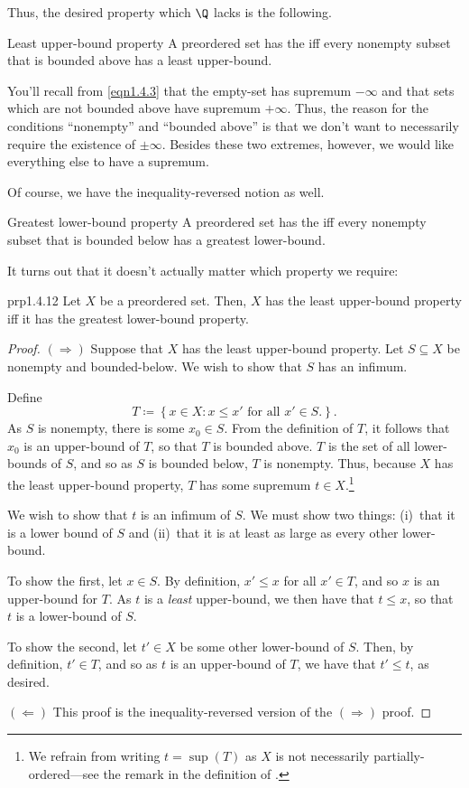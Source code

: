 Thus, the desired property which $\Q$ lacks is the following.
\begin{dfn}{Least upper-bound property}{}
A preordered set has the  iff every nonempty subset that is bounded above has a least upper-bound.
\begin{rmk}
You'll recall from \eqref{eqn1.4.3} that the empty-set has supremum $-\infty$ and that sets which are not bounded above have supremum $+\infty$.  Thus, the reason for the conditions ``nonempty'' and ``bounded above'' is that we don't want to necessarily require the existence of $\pm \infty$.  Besides these two extremes, however, we would like everything else to have a supremum.
\end{rmk}
\end{dfn}
Of course, we have the inequality-reversed notion as well.
\begin{dfn}{Greatest lower-bound property}{}
A preordered set has the  iff every nonempty subset that is bounded below has a greatest lower-bound.
\end{dfn}
It turns out that it doesn't actually matter which property we require:
\begin{prp}{}{prp1.4.12}
Let $X$ be a preordered set.  Then, $X$ has the least upper-bound property iff it has the greatest lower-bound property.
\begin{proof}
$(\Rightarrow )$ Suppose that $X$ has the least upper-bound property.  Let $S\subseteq X$ be nonempty and bounded-below.  We wish to show that $S$ has an infimum.

Define
\begin{equation}
T\coloneqq \left\{ x\in X:x\leq x'\text{ for all }x'\in S\text{.}\right\} .
\end{equation}
As $S$ is nonempty, there is some $x_0\in S$.  From the definition of $T$, it follows that $x_0$ is an upper-bound of $T$, so that $T$ is bounded above.  $T$ is the set of all lower-bounds of $S$, and so as $S$ is bounded below, $T$ is nonempty.  Thus, because $X$ has the least upper-bound property, $T$ has some supremum $t\in X$.\footnote{We refrain from writing $t=\sup (T)$ as $X$ is not necessarily partially-ordered---see the remark in the definition of .}

We wish to show that $t$ is an infimum of $S$.  We must show two things:  (i)~that it is a lower bound of $S$ and (ii)~that it is at least as large as every other lower-bound.

To show the first, let $x\in S$.  By definition, $x'\leq x$ for all $x'\in T$, and so $x$ is an upper-bound for $T$.  As $t$ is a \emph{least} upper-bound, we then have that $t\leq x$, so that $t$ is a lower-bound of $S$.

To show the second, let $t'\in X$ be some other lower-bound of $S$.  Then, by definition, $t'\in T$, and so as $t$ is an upper-bound of $T$, we have that $t'\leq t$, as desired.

\blankline
\noindent
$(\Leftarrow )$ This proof is the inequality-reversed version of the $(\Rightarrow )$ proof.
\end{proof}
\end{prp}
